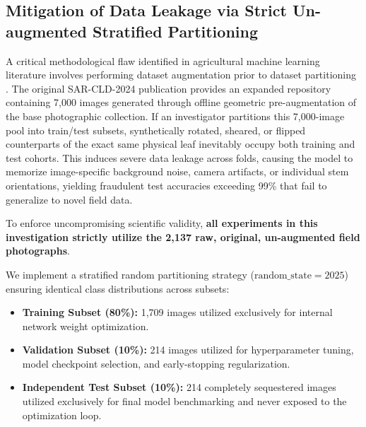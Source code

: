\documentclass[journal,10pt,twocolumn]{IEEEtran}
\begin{document}
\subsection{Mitigation of Data Leakage via Strict Un-augmented Stratified Partitioning}
A critical methodological flaw identified in agricultural machine learning literature involves performing dataset augmentation prior to dataset partitioning \cite{bishshash2024sar}. The original SAR-CLD-2024 publication provides an expanded repository containing 7,000 images generated through offline geometric pre-augmentation of the base photographic collection. If an investigator partitions this 7,000-image pool into train/test subsets, synthetically rotated, sheared, or flipped counterparts of the exact same physical leaf inevitably occupy both training and test cohorts. This induces severe data leakage across folds, causing the model to memorize image-specific background noise, camera artifacts, or individual stem orientations, yielding fraudulent test accuracies exceeding 99\% that fail to generalize to novel field data.

To enforce uncompromising scientific validity, \textbf{all experiments in this investigation strictly utilize the 2,137 raw, original, un-augmented field photographs}.

We implement a stratified random partitioning strategy ($\text{random\_state}=2025$) ensuring identical class distributions across subsets:
\begin{itemize}[leftmargin=*]
    \item \textbf{Training Subset (80\%):} 1,709 images utilized exclusively for internal network weight optimization.
    \item \textbf{Validation Subset (10\%):} 214 images utilized for hyperparameter tuning, model checkpoint selection, and early-stopping regularization.
    \item \textbf{Independent Test Subset (10\%):} 214 completely sequestered images utilized exclusively for final model benchmarking and never exposed to the optimization loop.
\end{itemize}
\end{document}
